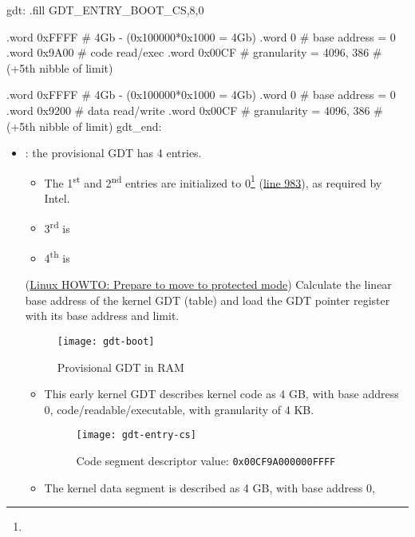 \begin{itemize}
\begin{enumerate}
\begin{gascode}
gdt:
     .fill GDT_ENTRY_BOOT_CS,8,0

     .word      0xFFFF   # 4Gb - (0x100000*0x1000 = 4Gb)
     .word      0        # base address = 0
     .word      0x9A00   # code read/exec
     .word      0x00CF   # granularity = 4096, 386
                         #  (+5th nibble of limit)

     .word      0xFFFF   # 4Gb - (0x100000*0x1000 = 4Gb)
     .word      0        # base address = 0
     .word      0x9200   # data read/write
     .word      0x00CF   # granularity = 4096, 386
                         #  (+5th nibble of limit)
gdt_end:
\end{gascode}
\begin{itemize}
\item {}: the provisional GDT has 4 entries.
  \begin{itemize}
  \item The 1\textsuperscript{st} and 2\textsuperscript{nd} entries are initialized to
    0\footnote{}
    (\href{http://lxr.linux.no/linux+v2.6.11/arch/i386/boot/setup.S#L983}{line 983}), as
    required by Intel.
    \begin{center}
    \end{center}
  \item 3\textsuperscript{rd} is 
  \item 4\textsuperscript{th} is 
  \end{itemize}
  (\href{http://www.tldp.org/HOWTO/Linux-Init-HOWTO-3.html}{Linux HOWTO: Prepare to move
    to protected mode}) Calculate the linear base address of the kernel GDT (table) and
  load the GDT pointer register with its base address and limit.
  \begin{figure}[h]
    \centering
    \texttt{[image: gdt-boot]}
    \caption{Provisional GDT in RAM}
    \label{fig:gdt-boot}
  \end{figure}
  \begin{itemize}
  \item This early kernel GDT describes kernel code as 4 GB, with base address 0,
    code/readable/executable, with granularity of 4 KB.
    \begin{figure}[h]
      \centering
      \texttt{[image: gdt-entry-cs]}
      \caption{Code segment descriptor value: \texttt{0x00CF9A000000FFFF}}
      \label{fig:cs}
    \end{figure}
  \item The kernel data segment is described as 4 GB, with base address 0,

\end{itemize}
\end{itemize}
\end{enumerate}
\end{itemize}
